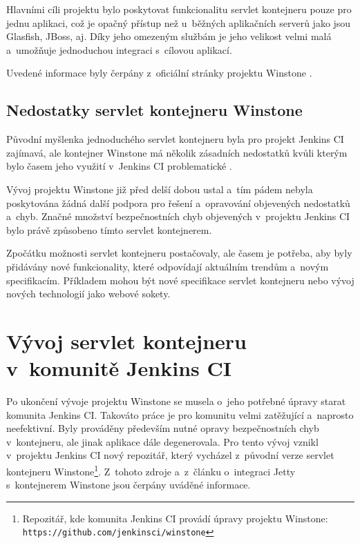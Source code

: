         Hlavními cíli projektu bylo poskytovat funkcionalitu servlet kontejneru pouze pro jednu aplikaci,
        což je opačný přístup než u~běžných aplikačních serverů jako jsou Glasfish, JBoss, aj.
        Díky jeho omezeným službám je jeho velikost velmi malá a~umožňuje jednoduchou integraci
        s~cílovou aplikací.

        Uvedené informace byly čerpány z~oficiální stránky projektu Winstone \cite{winstoneWeb}.

        \subsection{Nedostatky servlet kontejneru Winstone}
            Původní myšlenka jednoduchého servlet kontejneru byla pro projekt Jenkins CI zajímavá, ale
            kontejner Winstone má několik zásadních nedostatků kvůli kterým bylo časem jeho využití
            v~Jenkins CI problematické \cite{kohsukeTopic}. 

            Vývoj projektu Winstone již před delší dobou ustal a~tím pádem nebyla poskytována 
            žádná další podpora pro řešení a~opravování objevených nedostatků a~chyb. 
            Značné množství bezpečnostních chyb objevených v~projektu Jenkins CI bylo právě
            způsobeno tímto servlet kontejnerem.

            Zpočátku možnosti servlet kontejneru postačovaly, ale časem je potřeba, aby 
            byly přidávány nové funkcionality, které odpovídají aktuálním trendům
            a~novým specifikacím. Příkladem mohou být nové specifikace servlet kontejneru nebo
            vývoj nových technologií jako webové sokety.


    \section{Vývoj servlet kontejneru v~komunitě Jenkins CI} \label{vyvojWinstone}
        Po ukončení vývoje projektu Winstone se musela o~jeho potřebné úpravy starat komunita
        Jenkins CI. Takováto práce je pro komunitu velmi zatěžující
        a~naprosto neefektivní. Byly prováděny především nutné opravy bezpečnostních chyb v~kontejneru,
        ale jinak aplikace dále degenerovala. Pro tento vývoj vznikl v~projektu Jenkins CI nový 
        repozitář, který vycházel z~původní verze servlet kontejneru 
        Winstone\footnote{Repozitář, kde komunita Jenkins CI provádí úpravy projektu Winstone:
        \texttt{https://github.com/jenkinsci/winstone}}. Z~tohoto zdroje
        a~z~článku o~integraci Jetty s~kontejnerem Winstone \cite{kohsukeTopic} jsou čerpány uváděné informace. 
        
